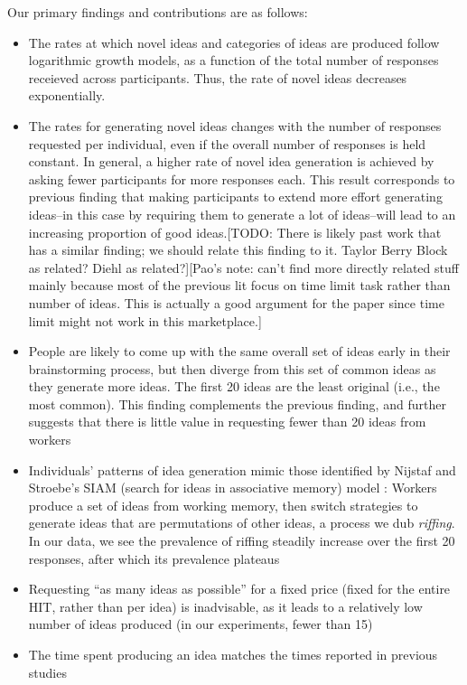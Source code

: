 Our primary findings and contributions are as follows:
\begin{itemize}
\item The rates at which novel ideas and categories of ideas are produced follow logarithmic growth models, as a function of the total number of responses receieved across participants. Thus, the rate of novel ideas decreases exponentially. 
\item The rates for generating novel ideas changes with the number of responses requested per individual, even if the overall number of responses is held constant. In general, a higher rate of novel idea generation is achieved by asking fewer participants for more responses each. This result corresponds to previous finding that making participants to extend more effort generating ideas--in this case by requiring them to generate a lot of ideas--will lead to an increasing proportion of good ideas\cite{parnes_effects_1961}.[TODO: There is likely past work that has a similar finding; we should relate this finding to it. Taylor Berry Block as related? Diehl as related?][Pao's note: can't find more directly related stuff mainly because most of the previous lit focus on time limit task rather than number of ideas. This is actually a good argument for the paper since time limit might not work in this marketplace.]
\item People are likely to come up with the same overall set of ideas early in their brainstorming process, but then diverge from this set of common ideas as they generate more ideas. The first 20 ideas are the least original (i.e., the most common). This finding complements the previous finding, and further suggests that there is little value in requesting fewer than 20 ideas from workers
\item Individuals' patterns of idea generation mimic those identified by Nijstaf and Stroebe's SIAM (search for ideas in associative memory) model \cite{nijstad_how_2006}: Workers produce a set of ideas from working memory, then switch strategies to generate ideas that are permutations of other ideas, a process we dub {\em riffing\/}. In our data, we see the prevalence of riffing steadily increase over the first 20 responses, after which its prevalence plateaus
\item Requesting ``as many ideas as possible'' for a fixed price (fixed for the entire HIT, rather than per idea) is inadvisable, as it leads to a relatively low number of ideas produced (in our experiments, fewer than 15)
\item The time spent producing an idea matches the times reported in previous studies \cite{nijstad_how_2006}
\end{itemize}

